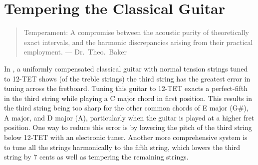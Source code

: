 %
%
%

 \section{Tempering the Classical Guitar\label{sct:temp}}

 \begin{quote}
 Temperament: A compromise between the acoustic purity of theoretically exact intervals, and the harmonic discrepancies arising from their practical employment. --- Dr.\ Theo.\ Baker~\cite{ref:baker1895dmt}
 \end{quote}

In , a uniformly compensated classical guitar with normal tension strings tuned to 12-TET shows (of the treble strings) the third string has the greatest error in tuning across the fretboard. Tuning this guitar to 12-TET exacts a perfect-fifth in the third string while playing a C major chord in first position. This results in the third string being too sharp for the other common chords of E major (G\#), A major, and D major (A), particularly when the guitar is played at a higher fret position. One way to reduce this error is by lowering the pitch of the third string below 12-TET with an electronic tuner. Another more comprehensive system is to tune all the strings harmonically to the fifth string, which lowers the third string by 7 cents as well as tempering the remaining strings.

